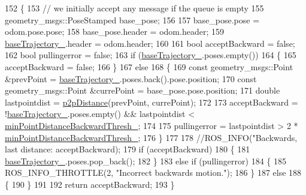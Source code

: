 \begin{DoxyCode}
152 \{
153     \textcolor{comment}{// we initially accept any message if the queue is empty}
155 \textcolor{comment}{}    geometry\_msgs::PoseStamped base\_pose;
156 
157     base\_pose.pose = odom.pose.pose;
158     base\_pose.header = odom.header;
159     \hyperlink{classmove__base__z__client_1_1odom__tracker_1_1OdomTracker_a83fa5a9bfe0b2683eee33444d3f030ea}{baseTrajectory\_}.header = odom.header;
160 
161     \textcolor{keywordtype}{bool} acceptBackward = \textcolor{keyword}{false};
162     \textcolor{keywordtype}{bool} pullingerror = \textcolor{keyword}{false};
163     \textcolor{keywordflow}{if} (\hyperlink{classmove__base__z__client_1_1odom__tracker_1_1OdomTracker_a83fa5a9bfe0b2683eee33444d3f030ea}{baseTrajectory\_}.poses.empty())
164     \{
165         acceptBackward = \textcolor{keyword}{false};
166     \}
167     \textcolor{keywordflow}{else}
168     \{
169         \textcolor{keyword}{const} geometry\_msgs::Point &prevPoint = \hyperlink{classmove__base__z__client_1_1odom__tracker_1_1OdomTracker_a83fa5a9bfe0b2683eee33444d3f030ea}{baseTrajectory\_}.poses.back().pose.position;
170         \textcolor{keyword}{const} geometry\_msgs::Point &currePoint = base\_pose.pose.position;
171         \textcolor{keywordtype}{double} lastpointdist = \hyperlink{namespacemove__base__z__client_1_1odom__tracker_a4437fd4b6bf9ca87f5b806ad408fb430}{p2pDistance}(prevPoint, currePoint);
172 
173         acceptBackward = !\hyperlink{classmove__base__z__client_1_1odom__tracker_1_1OdomTracker_a83fa5a9bfe0b2683eee33444d3f030ea}{baseTrajectory\_}.poses.empty() && lastpointdist < 
      \hyperlink{classmove__base__z__client_1_1odom__tracker_1_1OdomTracker_afdcfc389baa89c5583bf32bf5fdc7e16}{minPointDistanceBackwardThresh\_};
174 
175         pullingerror = lastpointdist > 2 * \hyperlink{classmove__base__z__client_1_1odom__tracker_1_1OdomTracker_afdcfc389baa89c5583bf32bf5fdc7e16}{minPointDistanceBackwardThresh\_};
176     \}
177 
178     \textcolor{comment}{//ROS\_INFO("Backwards, last distance: %
       acceptBackward);}
179     \textcolor{keywordflow}{if} (acceptBackward)
180     \{
181         \hyperlink{classmove__base__z__client_1_1odom__tracker_1_1OdomTracker_a83fa5a9bfe0b2683eee33444d3f030ea}{baseTrajectory\_}.poses.pop\_back();
182     \}
183     \textcolor{keywordflow}{else} \textcolor{keywordflow}{if} (pullingerror)
184     \{
185         ROS\_INFO\_THROTTLE(2, \textcolor{stringliteral}{"Incorrect backwards motion."});
186     \}
187     \textcolor{keywordflow}{else}
188     \{
190     \}
191 
192     \textcolor{keywordflow}{return} acceptBackward;
193 \}
\end{DoxyCode}
